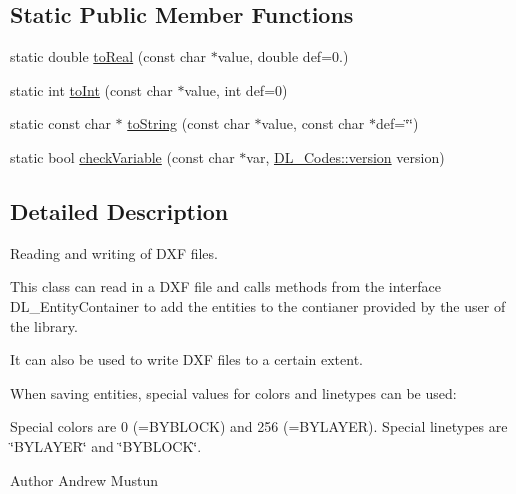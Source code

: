 \subsection*{Static Public Member Functions}
\begin{DoxyCompactItemize}
\item 
static double \hyperlink{classDL__Jww_a6a95607e4af33bb104255c203d7c7152}{to\-Real} (const char $\ast$value, double def=0.)
\item 
static int \hyperlink{classDL__Jww_a91a4c8cfe9f0feab648fe321f0ce99ce}{to\-Int} (const char $\ast$value, int def=0)
\item 
static const char $\ast$ \hyperlink{classDL__Jww_abad4d8debb1e9b5d58b01d072178913e}{to\-String} (const char $\ast$value, const char $\ast$def=\char`\"{}\char`\"{})
\item 
static bool \hyperlink{classDL__Jww_ad24d539b89e190a20792918229eac553}{check\-Variable} (const char $\ast$var, \hyperlink{classDL__Codes_a5eba107e2d280c70b52ffab0292fb9dc}{D\-L\-\_\-\-Codes\-::version} version)
\end{DoxyCompactItemize}


\subsection{Detailed Description}
Reading and writing of D\-X\-F files.

This class can read in a D\-X\-F file and calls methods from the interface D\-L\-\_\-\-Entity\-Container to add the entities to the contianer provided by the user of the library.

It can also be used to write D\-X\-F files to a certain extent.

When saving entities, special values for colors and linetypes can be used\-:

Special colors are 0 (=B\-Y\-B\-L\-O\-C\-K) and 256 (=B\-Y\-L\-A\-Y\-E\-R). Special linetypes are \char`\"{}\-B\-Y\-L\-A\-Y\-E\-R\char`\"{} and \char`\"{}\-B\-Y\-B\-L\-O\-C\-K\char`\"{}.

\begin{DoxyAuthor}{Author}
Andrew Mustun 
\end{DoxyAuthor}


